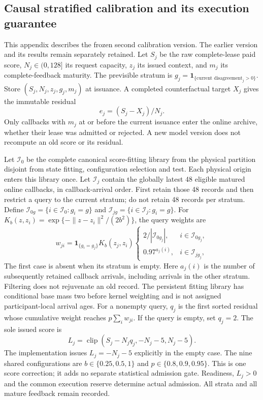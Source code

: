 \subsection{Causal stratified calibration and its execution guarantee}
\label{app:immutable-calibration-v2}
This appendix describes the frozen second calibration version. The earlier
version and its results remain separately retained. Let $S_j$ be the raw
complete-lease paid score, $N_j\in(0,128]$ its request capacity, $z_j$ its
issued context, and $m_j$ its complete-feedback maturity. The previsible
stratum is $g_j=\mathbf1_{\{\text{current disagreement}_j>0\}}$.
Store $(S_j,N_j,z_j,g_j,m_j)$ at issuance. A completed counterfactual
target $X_j$ gives the immutable residual
\begin{equation}
 e_j=(S_j-X_j)/N_j.
 \label{eq:v2-immutable-residual}
\end{equation}
Only callbacks with $m_j$ at or before the current issuance enter the
online archive, whether their lease was admitted or rejected. A new model
version does not recompute an old score or its residual.

Let $\mathcal I_0$ be the complete canonical score-fitting library from
the physical partition disjoint from state fitting, configuration
selection and test. Each physical origin enters this library once.
Let $\mathcal I_j$ contain the globally latest 48 eligible matured online
callbacks, in callback-arrival order. First retain those 48 records and
then restrict a query to the current stratum; do not retain 48 records
per stratum. Define $\mathcal I_{0g}=\{i\in\mathcal I_0:g_i=g\}$ and
$\mathcal I_{jg}=\{i\in\mathcal I_j:g_i=g\}$. For
$K_b(z,z_i)=\exp\{-\|z-z_i\|^2/(2b^2)\}$, the query weights are
\begin{equation}
 w_{ji}=\mathbf1_{\{g_i=g_j\}}K_b(z_j,z_i)
 \begin{cases}
 2/|\mathcal I_{0g_j}|,&i\in\mathcal I_{0g_j},\\
 0.97^{a_j(i)},&i\in\mathcal I_{jg_j},
 \end{cases}
 \label{eq:v2-stratified-calibration-weights}
\end{equation}
The first case is absent when its stratum is empty. Here $a_j(i)$ is
the number of subsequently retained callback arrivals, including arrivals
in the other stratum. Filtering does not rejuvenate an old record.
The persistent fitting library has conditional base mass two before
kernel weighting and is not assigned participant-local arrival ages.
For a nonempty query, $q_j$ is the first sorted residual whose cumulative
weight reaches $p\sum_iw_{ji}$. If the query is empty, set $q_j=2$.
The sole issued score is
\begin{equation}
 L_j=\operatorname{clip}(S_j-N_jq_j,-N_j-5,N_j-5).
 \label{eq:v2-conditional-paid-score}
\end{equation}
The implementation issues $L_j=-N_j-5$ explicitly in the empty case.
The nine shared configurations are
$b\in\{0.25,0.5,1\}$ and $p\in\{0.8,0.9,0.95\}$.
This is one score correction; it adds no separate statistical admission
gate. Readiness, $L_j>0$ and the common execution reserve determine
actual admission. All strata and all mature feedback remain recorded.

